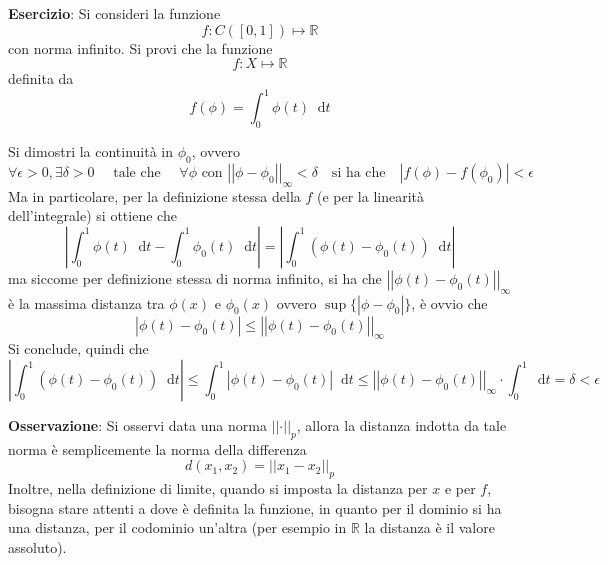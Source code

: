 \documentclass[a4paper]{extarticle}
\newcommand*\dif{\mathop{}\!\mathrm{d}}
\begin{document}
\vspace{2em}
\noindent
\textbf{Esercizio}: Si consideri la funzione
\[f : C([0,1]) \longmapsto \mathbb{R}\]
con norma infinito. Si provi che la funzione
\[f : X \longmapsto \mathbb{R}\]
definita da
\[f(\phi) = \int_0^1 \phi(t) \dif t\]

\vspace{1em}
\noindent
Si dimostri la continuità in $\phi_0$, ovvero
\[\forall \epsilon > 0, \exists \delta > 0 \hspace{1em} \text{ tale che } \hspace{1em} \forall \phi \text{ con } \left \vert \left \vert \phi-\phi_0 \right \vert \right \vert_\infty < \delta \hspace{1em} \text{si ha che} \hspace{1em} \left \vert f(\phi) - f(\phi_0) \right \vert < \epsilon\]
Ma in particolare, per la definizione stessa della $f$ (e per la linearità dell'integrale) si ottiene che
\[\left \vert \int_0^1 \phi(t) \dif t - \int_0^1 \phi_0(t) \dif t\right \vert = \left \vert \int_0^1 (\phi(t) - \phi_0(t)) \dif t \right \vert\]
ma siccome per definizione stessa di norma infinito, si ha che $\left \vert \left \vert \phi(t) - \phi_0(t) \right \vert \right \vert_{\infty}$ è la massima distanza tra $\phi(x)$ e $\phi_0(x)$ ovvero $\sup\{\left \vert \phi-\phi_0 \right \vert\}$, è ovvio che
\[\left \vert \phi(t) - \phi_0(t) \right \vert \leq \left \vert \left \vert \phi(t) - \phi_0(t) \right \vert \right \vert_{\infty}\]
Si conclude, quindi che
\[\left \vert \int_0^1 (\phi(t) - \phi_0(t)) \dif t \right \vert \leq \int_0^1 \left \vert\phi(t) - \phi_0(t) \right \vert \dif t \leq \left \vert \left \vert \phi(t) - \phi_0(t) \right \vert \right \vert_{\infty} \cdot \int_0^1 \dif t = \delta < \epsilon\]

\vspace{2em}
\noindent
\textbf{Osservazione}: Si osservi data una norma $\vert \vert \cdot \vert \vert_p$, allora la distanza indotta da tale norma è semplicemente la norma della differenza
\[d(x_1,x_2) = \vert \vert x_1-x_2 \vert \vert_p\]
Inoltre, nella definizione di limite, quando si imposta la distanza per $x$ e per $f$, bisogna stare attenti a dove è definita la funzione, in quanto per il dominio si ha una distanza, per il codominio un'altra (per esempio in $\mathbb{R}$ la distanza è il valore assoluto).
\end{document}
